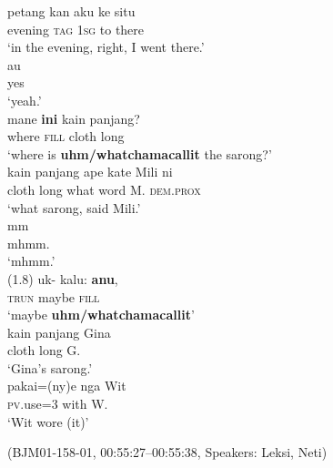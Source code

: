 \documentclass[output=paper,
\ChapterDOI{10.5281/zenodo.15697583}
colorlinks,
citecolor=brown]{langscibook}
\begin{document}
\begin{exe}
\ex\label{ex:ini-anu-indeter}
\begin{xlist}[0\quad →A:]
\gll petang kan aku ke situ\\
evening \textsc{tag} \textsc{1sg} to there\\
\glt `in the evening, right, I went there.' \\
\gll  au\\
 yes\\ 
\glt `yeah.' \\
\gll mane \textbf{ini} kain panjang?\\
where \textsc{fill} cloth long\\
\glt `where is \textbf{uhm/whatchamacallit} the sarong?'\\
\exi{4\quad \hphantom{→L:}}
\gll  kain panjang ape kate Mili ni\\
  cloth long what word M. \textsc{dem.prox}\\ 
\glt `what sarong, said Mili.'\\     
\gll  mm\\
mhmm.\\ 
\glt `mhmm.' \\
\exi{} (1.8)
\gll uk- kalu: \textbf{anu},\\
\textsc{trun} maybe \textsc{fill}\\
\glt `maybe \textbf{uhm/whatchamacallit}' \\
\exi{7\quad \hphantom{→L:}}
\gll kain panjang Gina\\
cloth long G.\\
\glt `Gina's sarong.' \\
\exi{8\quad \hphantom{→L:}}
\gll  pakai=(ny)e nga Wit\\
 \textsc{pv}.use=\textsc{3} with W.\\ 
\glt `Wit wore (it)' \\
\end{xlist}
\hfill (BJM01-158-01, 00:55:27--00:55:38, Speakers: Leksi, Neti)
\end{exe}
\end{document}
